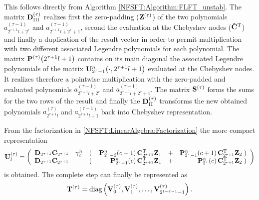 This follows directly from Algorithm \ref{NFSFT:Algorithm:FLFT_unstab}. The matrix $\mathbf{D}^{(\tau)}_{\text{III}}$ realizes first the zero-padding ($\mathbf{Z}^{(\tau)}$)
of the two polynomials $a^{(\tau-1)}_{2^{\tau+1}l+2^{\tau}}$ and $a^{(\tau-1)}_{2^{\tau+1}l+2^{\tau}+1}$, second the evaluation at the Chebyshev nodes ($\mathbf{\tilde{C}}^{\text{\rm{T}}}$) and finally a duplication of the result vector in order to permit multiplication with two different associated Legendre polynomials for each polynomial. The matrix $\mathbf{P}^{(\tau)}{\hspace{-0.4ex}}\left(2^{\tau+1}l+1\right)$ contains on its main diagonal the associated Legendre polynomials of the matrix $\mathbf{U}_{2^{\tau}-1}^n{\hspace{-0.4ex}}\left(\cdot,2^{\tau+1}l+1\right)$ evaluated at the Chebyshev nodes. It realizes therefore a pointwise multiplication with the zero-padded and evaluated polynomials $a^{(\tau-1)}_{2^{\tau+1}l+2^{\tau}}$ and $a^{(\tau-1)}_{2^{\tau+1}l+2^{\tau}+1}$. The matrix $\mathbf{S}^{(\tau)}$ forms the sums for the two rows of the result and finally the $\mathbf{D}^{(\tau)}_{\text{II}}$ transforms the new obtained polynomials $a^{(\tau)}_{2^{\tau+1}l}$ and $a^{(\tau-1)}_{2^{\tau+1}l+1}$ back into Chebyshev representation.

From the factorization in \eqref{NFSFT:LinearAlgebra:Factorization} the more compact representation
\begin{equation}
\label{UCompact}
\mathbf{U}^{(\tau)}_l = 
\left(\begin{array}{lclrcr}
  \mathbf{D}_{2^{\tau+1}} \mathbf{C}_{2^{\tau+1}} & \gamma_{c}^n & \left(\right. & \mathbf{P}_{2^{\tau}-2}^n{\hspace{-0.4ex}}\left(c+1\right) \mathbf{C}^{\text{\rm{T}}}_{2^{\tau+1}} \mathbf{Z}_{1} & + & 
  \mathbf{P}_{2^{\tau}-1}^n{\hspace{-0.4ex}}\left(c+1\right) \mathbf{C}^{\text{\rm{T}}}_{2^{\tau+1}} \mathbf{Z}_{2} \left.\right) \\
  \mathbf{D}_{2^{\tau+1}} \mathbf{C}_{2^{\tau+1}} & & \left(\right. & \mathbf{P}_{2^{\tau}-1}^n{\hspace{-0.4ex}}\left(c\right) \mathbf{C}^{\text{\rm{T}}}_{2^{\tau+1}} \mathbf{Z}_{1} & + & 
  \mathbf{P}_{2^{\tau}}^n{\hspace{-0.4ex}}\left(c\right) \mathbf{C}^{\text{\rm{T}}}_{2^{\tau+1}} \mathbf{Z}_{2} \left.\right)
\end{array}\right)
\end{equation}
is obtained.
The complete step can finally be represented as $$\mathbf{T}^{(\tau)} = \text{diag}\left(\mathbf{V}^{(\tau)}_0,\mathbf{V}^{(\tau)}_1,\dots,\mathbf{V}^{(\tau)}_{2^{t-\tau-1}-1}\right).$$

